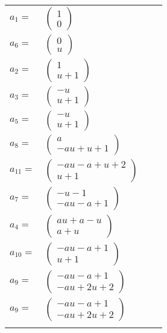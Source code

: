 \documentclass[1p]{elsarticle_modified}
\theoremstyle{definition}
\begin{document}
\begin{tabular}{m{7pt} m{180pt} m{7pt} m{180pt} }
\flushright $a_{1}=$&$\begin{pmatrix}1\\0\end{pmatrix}$ \\
\flushright $a_{6}=$&$\begin{pmatrix}0\\u\end{pmatrix}$ \\
\flushright $a_{2}=$&$\begin{pmatrix}1\\u+1\end{pmatrix}$ \\
\flushright $a_{3}=$&$\begin{pmatrix}- u\\u+1\end{pmatrix}$ \\
\flushright $a_{5}=$&$\begin{pmatrix}- u\\u+1\end{pmatrix}$ \\
\flushright $a_{8}=$&$\begin{pmatrix}a\\- a u+u+1\end{pmatrix}$ \\
\flushright $a_{11}=$&$\begin{pmatrix}- a u- a+u+2\\u+1\end{pmatrix}$ \\
\flushright $a_{7}=$&$\begin{pmatrix}- u-1\\- a u- a+1\end{pmatrix}$ \\
\flushright $a_{4}=$&$\begin{pmatrix}a u+a- u\\a+u\end{pmatrix}$ \\
\flushright $a_{10}=$&$\begin{pmatrix}- a u- a+1\\u+1\end{pmatrix}$ \\
\flushright $a_{9}=$&$\begin{pmatrix}- a u- a+1\\- a u+2 u+2\end{pmatrix}$\\ \flushright $a_{9}=$&$\begin{pmatrix}- a u- a+1\\- a u+2 u+2\end{pmatrix}$\\&\end{tabular}
\end{document}
